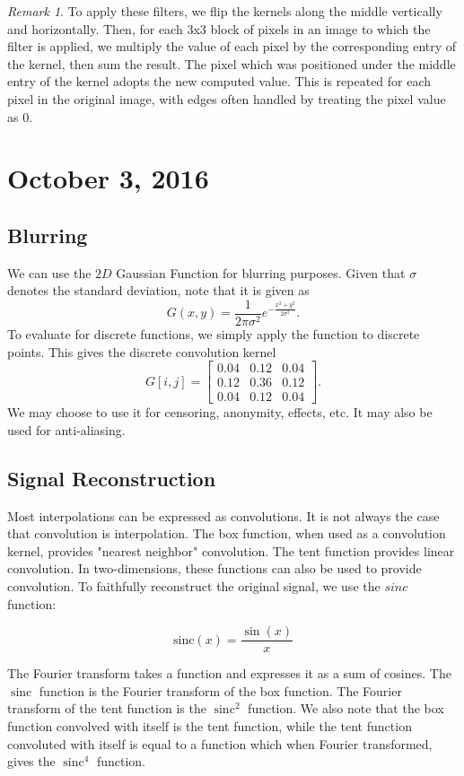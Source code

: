 \documentclass[11pt]{article}
\theoremstyle{plain} %
\theoremstyle{definition}
\theoremstyle{example}
\theoremstyle{remark}
\newtheorem*{remark}{Remark}
\DeclareMathOperator{\sinc}{sinc}
\begin{document}
\begin{remark}
To apply these filters, we flip the kernels along the middle vertically and horizontally. Then, for each 3x3 block of pixels in an image to which the filter is applied, we multiply the value of each pixel by the corresponding entry of the kernel, then sum the result. The pixel which was positioned under the middle entry of the kernel adopts the new computed value. This is repeated for each pixel in the original image, with edges often handled by treating the pixel value as 0.
\end{remark}

\section{October 3, 2016}

\subsection{Blurring}

We can use the $2D$ Gaussian Function for blurring purposes. Given that $\sigma$ denotes the standard deviation, note that it is given as
$$G(x,y) = \frac{1}{2\pi\sigma^2}e^{-\frac{x^2+y^2}{2\sigma^2}}.$$
To evaluate for discrete functions, we simply apply the function to discrete points. This gives the discrete convolution kernel 
$$G[i,j] = \begin{bmatrix}0.04 & 0.12 & 0.04\\ 0.12 & 0.36 & 0.12\\0.04 & 0.12 & 0.04\end{bmatrix}.$$
We may choose to use it for censoring, anonymity, effects, etc. It may also be used for anti-aliasing. 

\subsection{Signal Reconstruction}

Most interpolations can be expressed as convolutions. It is not always the case that convolution is interpolation. The box function, when used as a convolution kernel, provides "nearest neighbor" convolution. The tent function provides linear convolution. In two-dimensions, these functions can also be used to provide convolution. To faithfully reconstruct the original signal, we use the $sinc$ function:

$$\text{sinc}(x) = \frac{\sin(x)}{x}$$

The Fourier transform takes a function and expresses it as a sum of cosines. The $\sinc$ function is the Fourier transform of the box function. The Fourier transform of the tent function is the $\sinc^2$ function. We also note that the box function convolved with itself is the tent function, while the tent function convoluted with itself is equal to a function which when Fourier transformed, gives the $\sinc^4$ function. 
\end{document}

